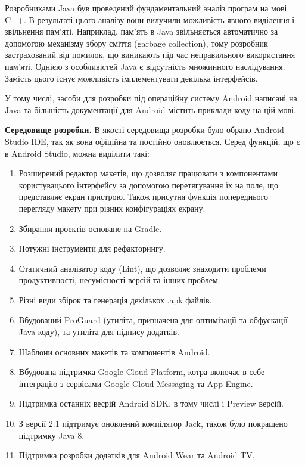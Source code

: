 \documentclass[../main.tex]{subfiles}
\begin{document}
Розробниками Java був проведений фундаментальний аналіз програм на мові C++. В результаті цього аналізу вони вилучили можливість явного виділення і звільнення пам'яті. Наприклад, пам'ять в Java звільняється автоматично за допомогою механізму збору сміття (garbage collection), тому розробник застрахований від помилок, що виникають під час неправильного використання пам'яті. Однією з особливістей Java є відсутність множинного наслідування. Замість цього існує можливість імплементувати декілька інтерфейсів.

У тому числі, засоби для розробки під операційну систему Android написані на Java та більшість документації для Android містить приклади коду на цій мові.

\textbf{Середовище розробки.}
В якості середовища розробки було обрано Android Studio IDE, так як вона офіційна та постійно оновлюється. Серед функцій, що є в Android Studio, можна виділити такі:

\begin{enumerate}
	\item Розширений редактор макетів, що дозволяє працювати з компонентами користувацього інтерфейсу за допомогою перетягування їх на поле, що представляє екран пристрою. Також присутня функція попереднього перегляду макету при різних конфігураціях екрану.
	\item Збирання проектів основане на Gradle.
	\item Потужні інструменти для рефакторингу.
	\item Статичний аналізатор коду (Lint), що дозволяє знаходити проблеми продуктивності, несумісності версій та інших проблем.
	\item Різні види збірок та генерація декількох .apk файлів.
	\item Вбудований ProGuard (утиліта, призначена для оптимізації та обфускації Java коду), та утиліта для підпису додатків.
	\item Шаблони основних макетів та компонентів Android.
	\item Вбудована підтримка Google Cloud Platform, котра включає в себе інтеграцію з сервісами Google Cloud Messaging та App Engine.
	\item Підтримка останніх весрій Android SDK, в тому числі і Preview версій.
	\item З версії 2.1 підтримує оновлений компілятор Jack, також було покращено підтримку Java 8.
	\item Підтримка розробки додатків для Android Wear та Android TV.
\end{enumerate}
\end{document}
